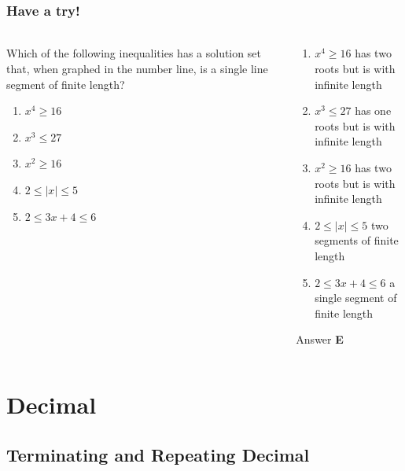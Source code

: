 \documentclass[
	11pt, %
]{beamer}
\begin{document}
\begin{frame}
	\frametitle{Have a try!}
	\framesubtitle{}

		\begin{columns}[t] %
		\begin{column}{0.45\textwidth} %
					Which of the following inequalities has a solution set that, when graphed in the
			number line, is a single line segment of finite length?\\
			   \begin{enumerate}[A]
			   \item $x^4 \geq 16$
			   \item $x^3 \leq 27$
			   \item $x^2 \geq 16$
			   \item $2 \leq \mid x \mid \leq 5$
			   \item $2 \leq 3x + 4 \leq 6$
			   \end{enumerate}
		\end{column}
		\begin{column}{0.5\textwidth} %
				\pause
				\begin{enumerate}[A]
			   \item $x^4 \geq 16 $ has two roots but is with infinite length
			   \item $x^3 \leq 27$ has  one roots but is with infinite length
			   \item $x^2 \geq 16$ has  two roots but is with infinite length
			   \item $2 \leq \mid x \mid \leq 5$ two segments of finite length
			   \item $2 \leq 3x + 4 \leq 6$ a single segment of finite length
			   \end{enumerate}
				\bigskip
				Answer \textbf{E}
		\end{column}
	\end{columns}
\end{frame}


\section{Decimal}

\subsection{Terminating and  Repeating Decimal}
\end{document}
